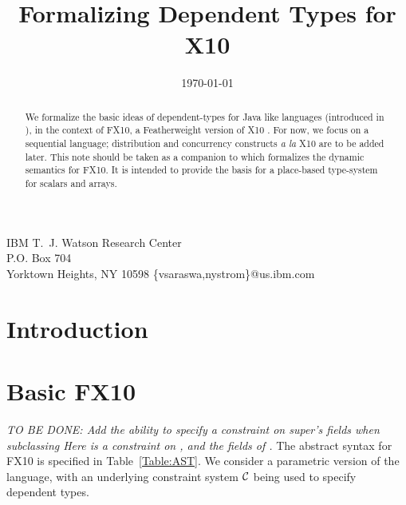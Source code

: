 \documentclass[nocopyrightspace,preprint,10pt]{sigplanconf}
\newcommand\Xten{{\sf X10}}
\newcommand\FXten{{\sf FX10}}
\begin{document}
\title{Formalizing Dependent Types for \Xten}
   {IBM T.~J. Watson Research Center \\
    P.O. Box 704 \\
    Yorktown Heights, NY 10598}
   {\{vsaraswa,nystrom\}@us.ibm.com}

\date{\today}
\maketitle


\begin{abstract}
We formalize the basic ideas of dependent-types for Java like
languages (introduced in \cite{DependentTypes}), in the context of
\FXten, a Featherweight version of \Xten{} \cite{X10}.  For now, we
focus on a sequential language; distribution and concurrency
constructs {\em a la} \Xten{} are to be added later. This note should
be taken as a companion to \cite{X10-concur} which formalizes the
dynamic semantics for \FXten. It is intended to provide the basis for
a place-based type-system for scalars and arrays.
\end{abstract}

\section{Introduction}

\section{Basic \FXten}
{\em 
TO BE DONE: Add the ability to specify a constraint on super's fields
when subclassing
Here  is a constraint on , and the
fields of .
}
The abstract syntax for \FXten{} is specified in
Table~\ref{Table:AST}. We consider a parametric version of the
language, with an underlying constraint system $\cal C$ \cite{cccc} being used to
specify dependent types. 
\end{document}
